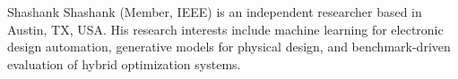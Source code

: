 \documentclass[nolineno]{ieeeaccess}
\begin{document}
\EOD

\clearpage

\begin{IEEEbiography}[]{Shashank}
Shashank (Member, IEEE) is an independent researcher
based in Austin, TX, USA. His research interests
include machine learning for electronic design automation, generative
models for physical design, and benchmark-driven evaluation of hybrid
optimization systems.
\end{IEEEbiography}
\end{document}
